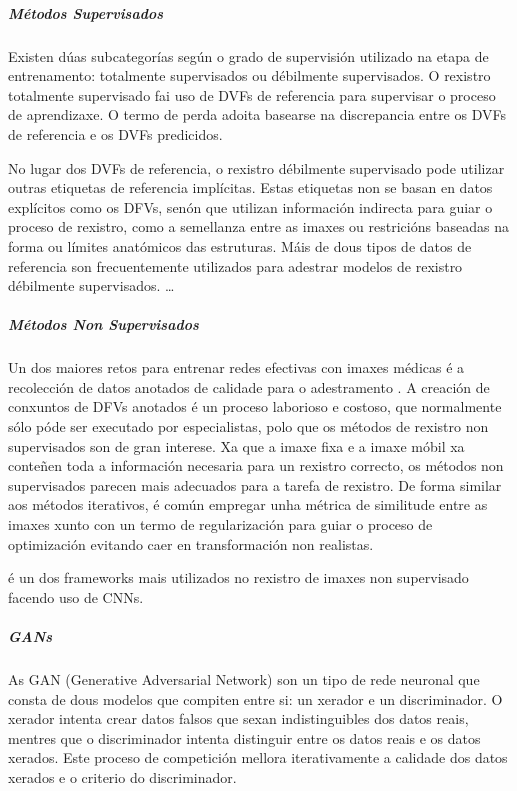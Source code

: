 \subparagraph{Métodos Supervisados}
\label{subparagraph:Métodos Supervisados}

Existen dúas subcategorías según o grado de supervisión utilizado na etapa de entrenamento: totalmente supervisados ou débilmente supervisados.
O rexistro totalmente supervisado fai uso de DVFs de referencia para supervisar o proceso de aprendizaxe.
 O termo de perda adoita basearse na discrepancia entre os DVFs de referencia e os DVFs predicidos.
 
No lugar dos DVFs de referencia, o rexistro débilmente supervisado pode utilizar outras etiquetas de referencia implícitas.
 Estas etiquetas non se basan en datos explícitos como os DFVs, senón que utilizan información indirecta para guiar o proceso de rexistro, como a semellanza entre as imaxes ou restricións baseadas na forma ou límites anatómicos das estruturas.
 Máis de dous tipos de datos de referencia son frecuentemente utilizados para adestrar modelos de rexistro débilmente supervisados. \cite{bharati2022deeplearningmedicalimage}
\dots

\subparagraph{Métodos Non Supervisados}
\label{subparagraph:Métodos Non Supervisados}

Un dos maiores retos para entrenar redes efectivas con imaxes médicas é a recolección de datos anotados de calidade para o adestramento \cite{medicalimageanalysis}.
A creación de conxuntos de DFVs anotados é un proceso laborioso e costoso, que normalmente sólo póde ser executado por especialistas, polo que os métodos de rexistro non supervisados son de gran interese.
Xa que a imaxe fixa e a imaxe móbil xa conteñen toda a información necesaria para un rexistro correcto, os métodos non supervisados parecen mais adecuados para a tarefa de rexistro.
De forma similar aos métodos iterativos, é común empregar unha métrica de similitude entre as imaxes xunto con un termo de regularización para guiar o proceso de optimización evitando caer en transformación non realistas.

\cite{Balakrishnan_2019voxelmorph} é un dos frameworks mais utilizados no rexistro de imaxes non supervisado facendo uso de CNNs.

\subparagraph{GANs}
\label{subparagraph:GANs}

As \gls{GAN} (Generative Adversarial Network) son un tipo de rede neuronal que consta de dous modelos que compiten entre si: un xerador e un discriminador. O xerador intenta crear datos falsos que sexan indistinguibles dos datos reais, mentres que o discriminador intenta distinguir entre os datos reais e os datos xerados. Este proceso de competición mellora iterativamente a calidade dos datos xerados e o criterio do discriminador.


